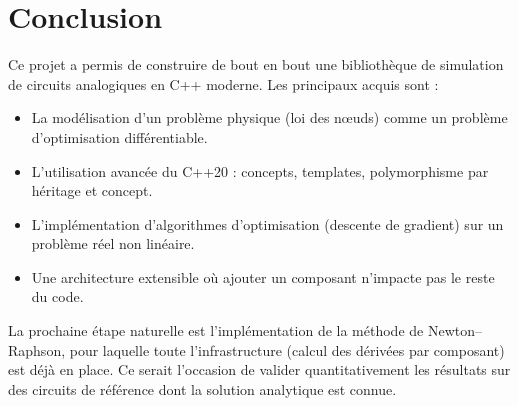 \documentclass[12pt,a4paper]{article}
\begin{document}
\section{Conclusion}

Ce projet a permis de construire de bout en bout une bibliothèque de simulation
de circuits analogiques en C++ moderne. Les principaux acquis sont :

\begin{itemize}
  \item La modélisation d'un problème physique (loi des nœuds) comme un problème
        d'optimisation différentiable.
  \item L'utilisation avancée du C++20 : concepts, templates, polymorphisme par
        héritage et concept.
  \item L'implémentation d'algorithmes d'optimisation (descente de gradient) sur un problème réel non linéaire.
  \item Une architecture extensible où ajouter un composant n'impacte pas le
        reste du code.
\end{itemize}

La prochaine étape naturelle est l'implémentation de la méthode de Newton--Raphson,
pour laquelle toute l'infrastructure (calcul des dérivées par composant) est
déjà en place. Ce serait l'occasion de valider quantitativement les résultats
sur des circuits de référence dont la solution analytique est connue.

\vfill
\end{document}
